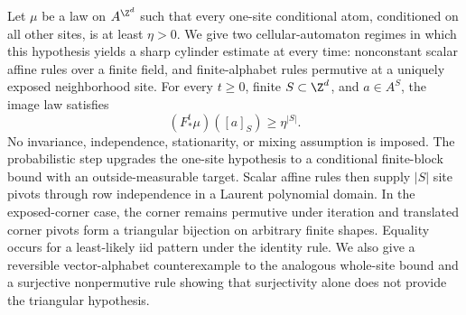 Let $\mu$ be a law on $A^{\Z^d}$ such that every one-site conditional atom,
conditioned on all other sites, is at least $\eta>0$.  We give two
cellular-automaton regimes in which this hypothesis yields a sharp cylinder
estimate at every time: nonconstant scalar affine rules over a finite field,
and finite-alphabet rules permutive at a uniquely exposed neighborhood site.
For every $t\geq0$, finite $S\subset\Z^d$, and $a\in A^S$, the image law
satisfies
\[
  (F^t_*\mu)([a]_S)\geq\eta^{|S|}.
\]
No invariance, independence, stationarity, or mixing assumption is imposed.
The probabilistic step upgrades the one-site hypothesis to a conditional
finite-block bound with an outside-measurable target.  Scalar affine rules
then supply $|S|$ site pivots through row independence in a Laurent
polynomial domain.  In the exposed-corner case, the corner remains permutive
under iteration and translated corner pivots form a triangular bijection on
arbitrary finite shapes.  Equality occurs for a least-likely iid pattern
under the identity rule.  We also give a reversible vector-alphabet
counterexample to the analogous whole-site bound and a surjective
nonpermutive rule showing that surjectivity alone does not provide the
triangular hypothesis.

